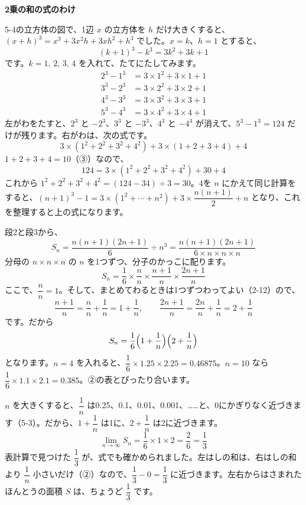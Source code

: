 \begin{motto}[4]
\noindent\textbf{2乗の和の式のわけ}\par
5-4の立方体の図で、1辺 $x$ の立方体を $h$ だけ大きくすると、$(x+h)^3=x^3+3x^2h+3xh^2+h^3$ でした。$x=k$、$h=1$ とすると、
\[ (k+1)^3-k^3=3k^2+3k+1 \]
です。$k=1,\,2,\,3,\,4$ を入れて、たてにたしてみます。
\begin{align*}
2^3-1^3&=3\times1^2+3\times1+1\\
3^3-2^3&=3\times2^2+3\times2+1\\
4^3-3^3&=3\times3^2+3\times3+1\\
5^3-4^3&=3\times4^2+3\times4+1
\end{align*}
左がわをたすと、$2^3$ と $-2^3$、$3^3$ と $-3^3$、$4^3$ と $-4^3$ が消えて、$5^3-1^3=124$ だけが残ります。右がわは、次の式です。
\[ 3\times(1^2+2^2+3^2+4^2)+3\times(1+2+3+4)+4 \]
\noindent $1+2+3+4=10$（③）なので、
\[ 124=3\times(1^2+2^2+3^2+4^2)+30+4 \]
これから $1^2+2^2+3^2+4^2=(124-34)\div3=30$。4を $n$ にかえて同じ計算をすると、$(n+1)^3-1=3\times(1^2+\cdots+n^2)+3\times\dfrac{n(n+1)}{2}+n$ となり、これを整理すると上の式になります。
\end{motto}

\par
段2と段3から、
\[ S_n=\frac{n(n+1)(2n+1)}{6}\div n^3=\frac{n(n+1)(2n+1)}{6\times n\times n\times n} \]
分母の $n\times n\times n$ の $n$ を1つずつ、分子のかっこに配ります。
\[ S_n=\frac{1}{6}\times\frac{n}{n}\times\frac{n+1}{n}\times\frac{2n+1}{n} \]
ここで、$\dfrac{n}{n}=1$。そして、まとめてわるときは1つずつわってよい（2-12）ので、
\[ \frac{n+1}{n}=\frac{n}{n}+\frac{1}{n}=1+\frac{1}{n},\qquad \frac{2n+1}{n}=\frac{2n}{n}+\frac{1}{n}=2+\frac{1}{n} \]
です。だから
\[ S_n=\frac{1}{6}\Bigl(1+\frac{1}{n}\Bigr)\Bigl(2+\frac{1}{n}\Bigr) \]
となります。$n=4$ を入れると、$\dfrac{1}{6}\times1.25\times2.25=0.46875$。$n=10$ なら $\dfrac{1}{6}\times1.1\times2.1=0.385$。②の表とぴったり合います。

\par
$n$ を大きくすると、$\dfrac{1}{n}$ は0.25、0.1、0.01、0.001、……と、0にかぎりなく近づきます（5-3）。だから、$1+\dfrac{1}{n}$ は1に、$2+\dfrac{1}{n}$ は2に近づきます。
\[ \lim_{n\to\infty}S_n=\frac{1}{6}\times1\times2=\frac{2}{6}=\frac{1}{3} \]
表計算で見つけた $\dfrac{1}{3}$ が、式でも確かめられました。左はしの和は、右はしの和より $\dfrac{1}{n}$ 小さいだけ（②）なので、$\dfrac{1}{3}-0=\dfrac{1}{3}$ に近づきます。左右からはさまれたほんとうの面積 $S$ は、ちょうど $\dfrac{1}{3}$ です。

